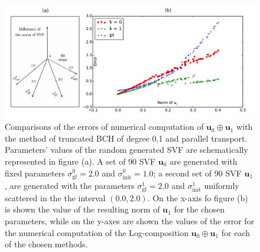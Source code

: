 \begin{figure}[!ht]
	\hspace{-1.5cm}
	\includegraphics[scale=0.6]{figures/SVF_scatter_plot.pdf}
	\caption{Comparisons of the errors of numerical computation of $\mathbf{u}_0\oplus \mathbf{u}_1$ with the method of truncated BCH of degree 0,1 and parallel transport. Parameters' values of the random generated SVF are schematically represented in figure (a). A set of $90$ SVF $\mathbf{u}_0$ are generated with fixed parameters $\sigma_{\text{gf}}^{0} = 2.0$ and $\sigma_{\text{init}}^{0} = 1.0$; a second set of $90$ SVF  $\mathbf{u}_1$, are generated with the parameters $\sigma_{\text{gf}}^{1} = 2.0$ and $\sigma_{\text{init}}^{1}$ uniformly scattered in the the interval $(0.0, 2.0)$. On the x-axis fo figure (b) is shown the value of the resulting norm of $\mathbf{u}_1$ for the chosen parameters, while on the y-axes are shown the values of the error for the numerical computation of the Log-composition $\mathbf{u}_0\oplus \mathbf{u}_1$ for each of the chosen methods.  }
	\label{fig:SVF_scatter_plot}
\end{figure}

